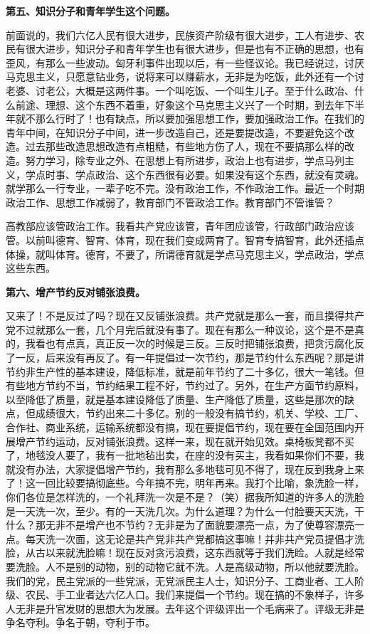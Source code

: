 \textbf{第五、知识分子和青年学生这个问题。}

前面说的，我们六亿人民有很大进步，民族资产阶级有很大进步，工人有进步、农民有很大进步，知识分子和青年学生也有很大进步，但是也有不正确的思想，也有歪风，有那么一些波动。匈牙利事件出现以后，有一些怪议论。我已经说过，讨厌马克思主义，只愿意钻业务，说将来可以赚薪水，无非是为吃饭，此外还有一个讨老婆、讨老公，大概是这两件事。一个叫吃饭、一个叫生儿子。至于什么政冶、什么前途、理想、这个东西不着重，好象这个马克思主义兴了一个时期，到去年下半年就不那么行时了！也有缺点，所以要加强思想工作，要加强政治工作。在我们的青年中间，在知识分子中间，进一步改造自己，还是要提改造，不要避免这个改造。过去那些改造思想改造有点粗糙，有些地方伤了人，现在不要搞那么样的改造。努力学习，除专业之外、在思想上有所进步，政治上也有进步，学点马列主义，学点时事、学点政治、这个东西很有必要。如果没有这个东西，就没有灵魂。就学那么一行专业，一辈子吃不完。没有政治工作，不作政治工作。最近一个时期政治工作、思想工作减弱了，教育部门不管政洽工作。教育部门不管谁管？

高教部应该管政治工作。我看共产党应该管，青年团应该管，行政部门政治应该管。以前叫德育、智育、体育，现在我们变成两育了。智育专搞智育，此外还插点体操，就叫体育。德育，不要了，所谓德育就是学点马克思主义，学点政治，学点这些东西。

\textbf{第六、增产节约反对铺张浪费。}

又来了！不是反过了吗？现在又反铺张浪费。共产党就是那么一套，而且摸得共产党不过就那么一套，几个月完后就没有事了。现在有那么一种议论，这个是不是真的，我看也有点真，真正反一次的时候是三反。三反时把铺张浪费，把贪污腐化反了一反，后来没有再反了。有一年提倡过一次节约，那是节约什么东西呢？那是讲节约非生产性的基本建设，降低标准，就是前年节约了二十多亿，很大一笔钱。但有些地方节约不当，节约结果工程不好，节约过了。另外，在生产方面节约原料，以至降低了质量，就是基本建设降低了质量、生产降低了质量，这些是那次的缺点，但成绩很大，节约出来二十多亿。别的一般没有搞节约，机关、学校、工厂、合作社、商业系统，运输系统都没有搞，现在要提倡节约，现在要在全国范围内开展增产节约运动，反对铺张浪费。这样一来，现在就开始见效。桌椅板凳都不买了，地毯没人要了，我有一批地毡出卖，在座的没有买主，我看如果你们不要，我就没有办法，大家提倡增产节约，我有那么多地毯可见不得了，现在反到我身上来了！这一回比较要搞彻底些。今年搞不完，明年再来。我打个比喻，象洗脸一样，你们各位是怎样洗的，一个礼拜洗一次是不是？（笑）据我所知道的许多人的洗脸是一天洗一次，至少。有的一天洗几次。为什么道理？为什么一付脸要天天洗，干什么？那无非不是增产也不节约？无非是为了面貌要漂亮一点，为了使尊容漂亮一点。每天洗一次面，这无论是共产党非共产党都搞这事嘛！并非共产党员提倡才洗脸，从古以来就洗脸嘛！现在反对贪污浪费，这东西就等于我们洗睑。人就是经常要洗脸。人不是别的动物，别的动物它就不洗。人是高级动物，所以他就要洗脸。我们的党，民主党派的一些党派，无党派民主人士，知识分子、工商业者、工人阶级、农民、手工业者达六亿人口。我们来提倡一个节约。现在搞的不象样子，许多人无非是升官发财的思想大为发展。去年这个评级评出一个毛病来了。评级无非是争名夺利。争名于朝，夺利于市。

